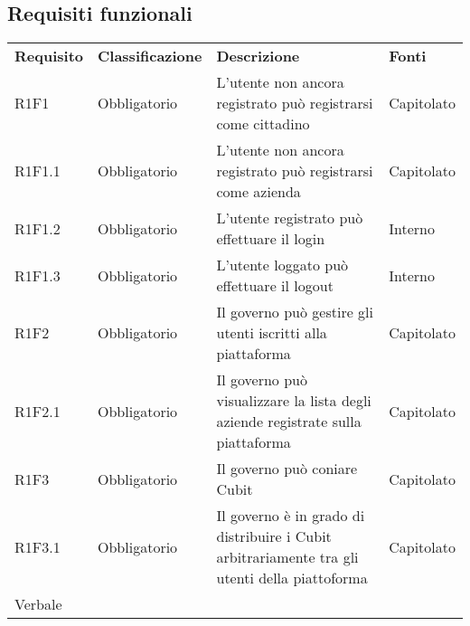 \subsection{Requisiti funzionali}
\begin{center}
	
	\begin{longtable}{ >{\centering}p{} >{\centering}p{}
			>{\raggedright}p{} >{\centering}p{}}
		
		\rowcolorhead 
		\textbf{\color{white}Requisito} 
		& \textbf{\color{white}Classificazione} 
		& \centering\textbf{\color{white}Descrizione}
		& \textbf{\color{white}Fonti} 
		\tabularnewline 	
		
		R1F1 & Obbligatorio & L'utente non ancora registrato può registrarsi come cittadino 
		& Capitolato
		\tabularnewline
		R1F1.1 & Obbligatorio & L'utente non ancora registrato può registrarsi come azienda 
		& Capitolato
		\tabularnewline
		R1F1.2 & Obbligatorio & L'utente registrato può effettuare il login &
		Interno
		\tabularnewline
		R1F1.3 & Obbligatorio & L'utente loggato può effettuare il logout & Interno
		\tabularnewline
		
		R1F2 & Obbligatorio & Il governo può gestire gli utenti iscritti alla piattaforma  & Capitolato
		\tabularnewline
		R1F2.1 & Obbligatorio & Il governo può visualizzare la lista degli aziende registrate sulla piattaforma & Capitolato
		\tabularnewline
		R1F3 & Obbligatorio & Il governo può coniare Cubit & Capitolato 
		\tabularnewline 
		R1F3.1 & Obbligatorio & Il governo è in grado di distribuire i Cubit arbitrariamente tra gli utenti della piattoforma & Capitolato \\ Verbale
		\tabularnewline
		
		
		
		
	\end{longtable}
\end{center}

